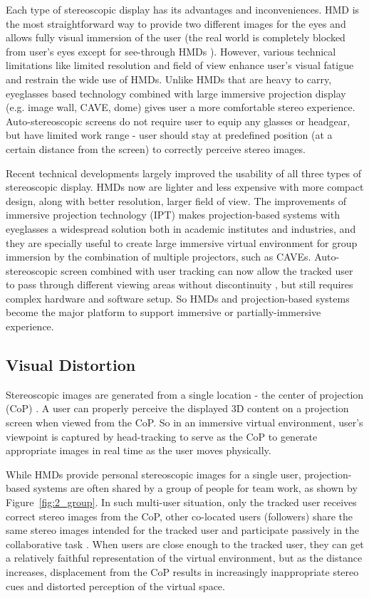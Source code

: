 Each type of stereoscopic display has its advantages and inconveniences. HMD is the most straightforward way to provide two different images for the eyes and allows fully visual immersion of the user (the real world is completely blocked from user's eyes except for see-through HMDs \citep{Schmalstieg2002Stube}). However, various technical limitations like limited resolution and field of view enhance user's visual fatigue and restrain the wide use of HMDs. Unlike HMDs that are heavy to carry, eyeglasses based technology combined with large immersive projection display (e.g. image wall, CAVE, dome) gives user a more comfortable stereo experience. Auto-stereoscopic screens do not require user to equip any glasses or headgear, but have limited work range - user should stay at predefined position (at a certain distance from the screen) to correctly perceive stereo images.

Recent technical developments largely improved the usability of all three types of stereoscopic display. HMDs now are lighter and less expensive with more compact design, along with better resolution, larger field of view. The improvements of immersive projection technology (IPT) \citep{Bullinger1997Immersive} makes projection-based systems with eyeglasses a widespread solution both in academic institutes and industries, and they are specially useful to create large immersive virtual environment for group immersion by the combination of multiple projectors, such as CAVEs. Auto-stereoscopic screen combined with user tracking can now allow the tracked user to pass through different viewing areas without discontinuity \citep{Kooima2010Tiled}, but still requires complex hardware and software setup. So HMDs and projection-based systems become the major platform to support immersive or partially-immersive experience.


\subsection{Visual Distortion}
Stereoscopic images are generated from a single location - the center of projection (CoP) \citep{Banks2009Perception}. A user can properly perceive the displayed 3D content on a projection screen when viewed from the CoP. So in an immersive virtual environment, user's viewpoint is captured by head-tracking to serve as the CoP to generate appropriate images in real time as the user moves physically.

While HMDs provide personal stereoscopic images for a single user, projection-based systems are often shared by a group of people for team work, as shown by Figure~\ref{fig:2_group}. In such multi-user situation, only the tracked user receives correct stereo images from the CoP, other co-located users (followers) share the same stereo images intended for the tracked user and participate passively in the collaborative task \citep{Bayon2006Multiple}. When users are close enough to the tracked user, they can get a relatively faithful representation of the virtual environment, but as the distance increases, displacement from the CoP results in increasingly inappropriate stereo cues and distorted perception of the virtual space.

